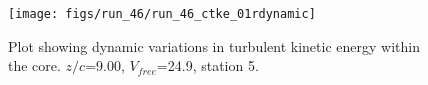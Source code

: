 \begin{figure}[H]
\centering
\texttt{[image: figs/run\_46/run\_46\_ctke\_01rdynamic]}
\caption{Plot showing dynamic variations in turbulent kinetic energy within the core. $z/c$=9.00, $V_{free}$=24.9, station 5.}
\label{fig:run_46_ctke_01rdynamic}
\end{figure}


